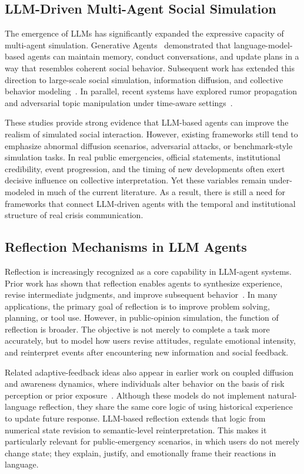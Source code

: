 \documentclass[11pt]{article}
\begin{document}
\subsection{LLM-Driven Multi-Agent Social Simulation}
The emergence of LLMs has significantly expanded the expressive capacity of multi-agent simulation. Generative Agents~\citep{park2023generative} demonstrated that language-model-based agents can maintain memory, conduct conversations, and update plans in a way that resembles coherent social behavior. Subsequent work has extended this direction to large-scale social simulation, information diffusion, and collective behavior modeling~\citep{mou2024socialmovement, yang2024oasis, gao2023s3, piao2025agentsociety}. In parallel, recent systems have explored rumor propagation and adversarial topic manipulation under time-aware settings~\citep{liu2025rumorsphere, zhang2024trendsim}.

These studies provide strong evidence that LLM-based agents can improve the realism of simulated social interaction. However, existing frameworks still tend to emphasize abnormal diffusion scenarios, adversarial attacks, or benchmark-style simulation tasks. In real public emergencies, official statements, institutional credibility, event progression, and the timing of new developments often exert decisive influence on collective interpretation. Yet these variables remain under-modeled in much of the current literature. As a result, there is still a need for frameworks that connect LLM-driven agents with the temporal and institutional structure of real crisis communication.

\subsection{Reflection Mechanisms in LLM Agents}
Reflection is increasingly recognized as a core capability in LLM-agent systems. Prior work has shown that reflection enables agents to synthesize experience, revise intermediate judgments, and improve subsequent behavior~\citep{park2023generative, yao2023react, shinn2023reflexion}. In many applications, the primary goal of reflection is to improve problem solving, planning, or tool use. However, in public-opinion simulation, the function of reflection is broader. The objective is not merely to complete a task more accurately, but to model how users revise attitudes, regulate emotional intensity, and reinterpret events after encountering new information and social feedback.

Related adaptive-feedback ideas also appear in earlier work on coupled diffusion and awareness dynamics, where individuals alter behavior on the basis of risk perception or prior exposure~\citep{funk2009awareness, granell2013awareness}. Although these models do not implement natural-language reflection, they share the same core logic of using historical experience to update future response. LLM-based reflection extends that logic from numerical state revision to semantic-level reinterpretation. This makes it particularly relevant for public-emergency scenarios, in which users do not merely change state; they explain, justify, and emotionally frame their reactions in language.
\end{document}
